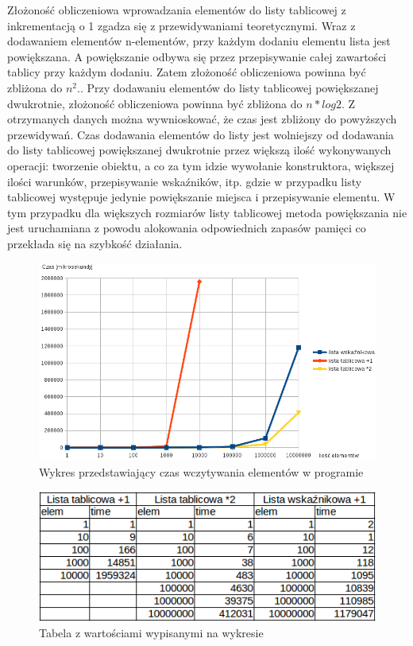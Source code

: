 \documentclass[a4paper,10pt]{scrartcl}
\begin{document}
Złożoność obliczeniowa wprowadzania elementów do listy tablicowej
z inkrementacją o 1 zgadza się z przewidywaniami teoretycznymi.
Wraz z dodawaniem elementów n-elementów, przy każdym dodaniu elementu
lista jest powiększana. A powiększanie odbywa się przez przepisywanie
całej zawartości tablicy przy każdym dodaniu. Zatem złożoność
obliczeniowa powinna być zbliżona do
\begin{math}
 n^{2}.
\end{math}.
Przy dodawaniu elementów do listy tablicowej powiększanej dwukrotnie,
złożoność obliczeniowa powinna być zbliżona do
\begin{math}
 n*log{2}
\end{math}.
Z otrzymanych danych można wywnioskować, że czas jest zbliżony do
powyższych przewidywań. Czas dodawania elementów do listy jest wolniejszy
od dodawania do listy tablicowej powiększanej dwukrotnie przez większą
ilość wykonywanych operacji: tworzenie obiektu, a co za tym idzie wywołanie
konstruktora, większej ilości warunków, przepisywanie wskaźników, itp.
gdzie w przypadku listy tablicowej występuje jedynie powiększanie miejsca
i przepisywanie elementu. W tym przypadku dla większych rozmiarów listy
tablicowej metoda powiększania nie jest uruchamiana z powodu alokowania
odpowiednich zapasów pamięci co przekłada się na szybkość działania.

\begin{figure}
 \centering
  \includegraphics[scale=0.6]{wykres1}
 \caption{Wykres przedstawiający czas wczytywania elementów w programie}
\end{figure}

\begin{figure}
 \centering
  \includegraphics[scale=0.7]{tabela}
 \caption{Tabela z wartościami wypisanymi na wykresie}
\end{figure}
\end{document}
